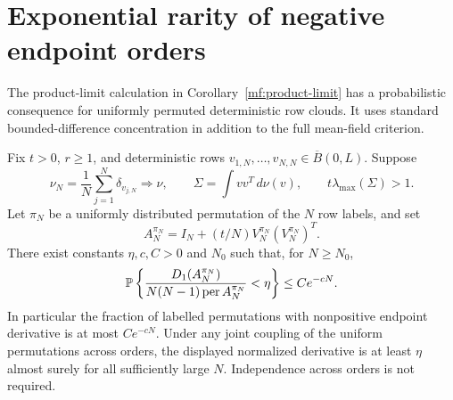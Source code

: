 
\section{Exponential rarity of negative endpoint orders}
\label{ro:section}

The product-limit calculation in Corollary~\ref{mf:product-limit} has
a probabilistic consequence for uniformly permuted deterministic row
clouds. It uses standard bounded-difference concentration in addition
to the full mean-field criterion.

\begin{corollary}\label{ro:random-order}
Fix \(t>0\), \(r\ge1\), and deterministic rows
\(v_{1,N},\ldots,v_{N,N}\in\overline B(0,L)\). Suppose
\[
 \nu_N=\frac1N\sum_{j=1}^N\delta_{v_{j,N}}\Longrightarrow\nu,
 \qquad
 \Sigma=\int vv^T\,d\nu(v),\qquad t\lambda_{\max}(\Sigma)>1.
\]
Let \(\pi_N\) be a uniformly distributed permutation of the \(N\)
row labels, and set
\[
 A_N^{\pi_N}=I_N+(t/N)V_N^{\pi_N}(V_N^{\pi_N})^T.
\]
There exist constants \(\eta,c,C>0\) and
\(N_0\) such that, for \(N\ge N_0\),
\begin{equation}\label{ro:exponential}
 \mathbb P\left\{
 \frac{D_1(A_N^{\pi_N})}{N(N-1)\operatorname{per} A_N^{\pi_N}}<\eta
 \right\}\le Ce^{-cN}.
\end{equation}
In particular the fraction of labelled permutations with nonpositive
endpoint derivative is at most \(Ce^{-cN}\).
Under any joint coupling of the uniform permutations across orders,
the displayed normalized derivative is at least \(\eta\) almost
surely for all sufficiently large \(N\). Independence across orders
is not required.
\end{corollary}
